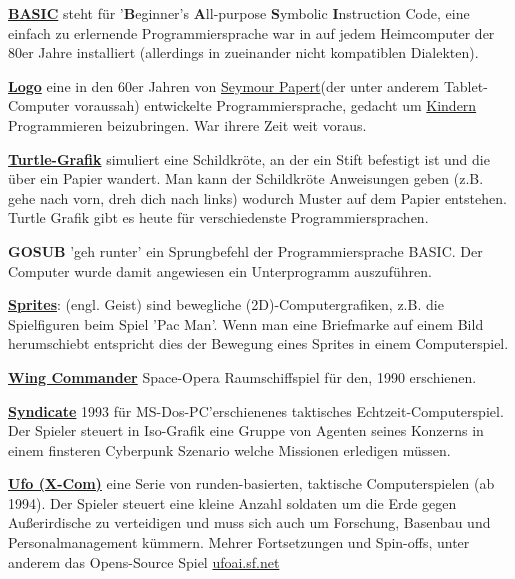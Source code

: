 \documentclass[10pt,a4paper,ngerman,twoside]{article} %
\begin{document}
\begin{multicols}{3}
\href{https://de.wikipedia.org/wiki/BASIC}{\textbf{BASIC}} steht für '\textbf{B}eginner’s \textbf{A}ll-purpose \textbf{S}ymbolic \textbf{I}nstruction Code, eine einfach zu erlernende Programmiersprache war in auf jedem Heimcomputer der 80er Jahre installiert (allerdings in zueinander nicht kompatiblen Dialekten). 

\href{https://de.wikipedia.org/wiki/Logo_(Programmiersprache)}{\textbf{Logo}} eine in den 60er Jahren von \href{https://de.wikipedia.org/wiki/Seymour_Papert}{Seymour Papert}(der unter anderem Tablet-Computer voraussah) entwickelte Programmiersprache, gedacht um \href{http://goo.gl/zJG9WU}{Kindern} Programmieren beizubringen. War ihrere Zeit weit voraus.

\href{https://de.wikipedia.org/wiki/Turtlegraphics}{\textbf{Turtle-Grafik}} simuliert eine Schildkröte, an der ein Stift befestigt ist und die über ein Papier wandert. Man kann der Schildkröte Anweisungen geben (z.B. gehe nach vorn, dreh dich nach links) wodurch Muster auf dem Papier entstehen. Turtle Grafik gibt es heute für verschiedenste Programmiersprachen.

\textbf{GOSUB} 'geh runter' ein Sprungbefehl der Programmiersprache BASIC. Der Computer wurde damit angewiesen ein Unterprogramm auszuführen.

\href{https://de.wikipedia.org/wiki/Sprite_(Computergrafik)}{\textbf{Sprites}}: (engl. Geist) sind bewegliche (2D)-Computergrafiken, z.B. die Spielfiguren beim Spiel 'Pac Man'.  Wenn man eine Briefmarke auf einem Bild herumschiebt entspricht dies der Bewegung eines Sprites in einem Computerspiel.

\href{https://de.wikipedia.org/wiki/Wing_Commander_(Computerspiel)}{\textbf{Wing Commander}} Space-Opera Raumschiffspiel für den, 1990 erschienen.

\href{https://de.wikipedia.org/wiki/Syndicate}{\textbf{Syndicate}} 1993 für MS-Dos-PC'erschienenes taktisches Echtzeit-Computerspiel. Der Spieler steuert in Iso-Grafik eine Gruppe von Agenten seines Konzerns in einem finsteren Cyberpunk Szenario welche Missionen erledigen müssen.

\href{https://de.wikipedia.org/wiki/X-COM}{\textbf{Ufo (X-Com)}} eine Serie von runden-basierten, taktische Computerspielen (ab 1994). Der Spieler steuert eine  kleine Anzahl soldaten um die Erde gegen Außerirdische zu verteidigen und muss sich auch um Forschung, Basenbau und Personalmanagement kümmern. Mehrer Fortsetzungen und Spin-offs, unter anderem das Opens-Source Spiel \url{ufoai.sf.net}


\end{multicols}
\end{document}
